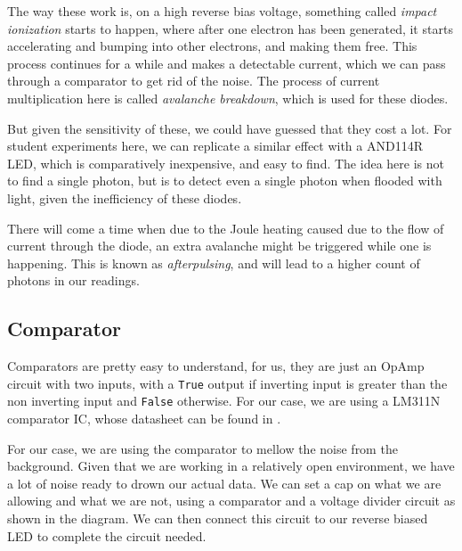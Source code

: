\documentclass{double}
\begin{document}
\begin{multicols*}{2}
The way these work is, on a high reverse bias voltage, something called \emph{impact ionization} starts to happen, where after one electron has been generated, it starts accelerating and bumping into other electrons, and making them free. This process continues for a while and makes a detectable current, which we can pass through a comparator to get rid of the noise. The process of current multiplication here is called \emph{avalanche breakdown}, which is used for these diodes.

But given the sensitivity of these, we could have guessed that they cost a lot. For student experiments here, we can replicate a similar effect with a AND114R LED, which is comparatively inexpensive, and easy to find. The idea here is not to find a single photon, but is to detect even a single photon when flooded with light, given the inefficiency of these diodes. 

There will come a time when due to the Joule heating caused due to the flow of current through the diode, an extra avalanche might be triggered while one is happening. This is known as \emph{afterpulsing}, and will lead to a higher count of photons in our readings.

\subsection{Comparator}
Comparators are pretty easy to understand, for us, they are just an OpAmp circuit with two inputs, with a \texttt{True} output if inverting input is greater than the non inverting input and \texttt{False} otherwise. For our case, we are using a LM311N comparator IC, whose datasheet can be found in \cite{lm311}.

For our case, we are using the comparator to mellow the noise from the background. Given that we are working in a relatively open environment, we have a lot of noise ready to drown our actual data. We can set a cap on what we are allowing and what we are not, using a comparator and a voltage divider circuit as shown in the diagram. We can then connect this circuit to our reverse biased LED to complete the circuit needed.


\end{multicols*}
\end{document}
